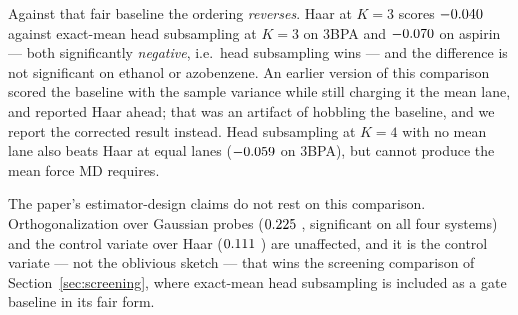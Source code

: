 \documentclass{article}
\begin{document}
Against that fair baseline the ordering \emph{reverses}. Haar at $K{=}3$ scores
$-0.040$ \fsDeltaVsHeadSubCI{} against exact-mean head subsampling at $K{=}3$ on 3BPA and
$-0.070$ \fsDeltaVsHeadSubAspirinCI{} on aspirin --- both significantly
\emph{negative}, i.e.\ head subsampling wins --- and the difference is not significant on ethanol or
azobenzene. An earlier version of this comparison scored the baseline with the sample variance while
still charging it the mean lane, and reported Haar ahead; that was an artifact of hobbling the
baseline, and we report the corrected result instead. Head subsampling at $K{=}4$ with no mean lane
also beats Haar at equal lanes ($-0.059$
\fsDeltaVsHeadSubNoMeanThreeBPACI{} on 3BPA), but cannot produce the mean force MD requires.

The paper's estimator-design claims do not rest on this comparison. Orthogonalization over Gaussian
probes ($0.225$ \fsDeltaOrthoCI{}, significant on all four systems) and the control variate
over Haar ($0.111$ \fsDeltaCVCI{}) are unaffected, and it is the control variate --- not the
oblivious sketch --- that wins the screening comparison of Section~\ref{sec:screening}, where
exact-mean head subsampling is included as a gate baseline in its fair form.

\end{document}
